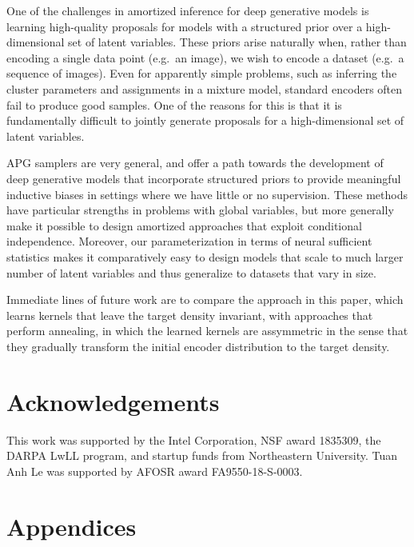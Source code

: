\documentclass[anonymous=false, %
               format=acmsmall, %
               review=true, %
               screen=true, %
               nonacm=true]{acmart}
\theoremstyle{definition}
\begin{document}
One of the challenges in amortized inference for deep generative models is learning high-quality proposals for models with a structured prior over a high-dimensional set of latent variables. These priors arise naturally when, rather than encoding a single data point (e.g.~an image), we wish to encode a dataset (e.g.~a sequence of images). 
Even for apparently simple problems, such as inferring the cluster parameters and assignments in a mixture model, standard encoders often fail to produce good samples. One of the reasons for this is that it is fundamentally difficult to jointly generate proposals for a high-dimensional set of latent variables.

APG samplers are very general, and offer a path towards the development of deep generative models that incorporate structured priors to provide meaningful inductive biases in settings where we have little or no supervision. These methods have particular strengths in problems with global variables, but more generally make it possible to design amortized approaches that exploit conditional independence. Moreover, our parameterization in terms of neural sufficient statistics makes it comparatively easy to design models that scale to much larger number of latent variables and thus generalize to datasets that vary in size. 

Immediate lines of future work are to compare the approach in this paper, which learns kernels that leave the target density invariant, with approaches that perform annealing, in which the learned kernels are assymmetric in the sense that they gradually transform the initial encoder distribution to the target density. 

\section{Acknowledgements}

This work was supported by the Intel Corporation, NSF award 1835309, the DARPA LwLL program, and startup funds from Northeastern University. Tuan Anh Le was supported by AFOSR award FA9550-18-S-0003.




\newpage
\section{Appendices}
\end{document}
